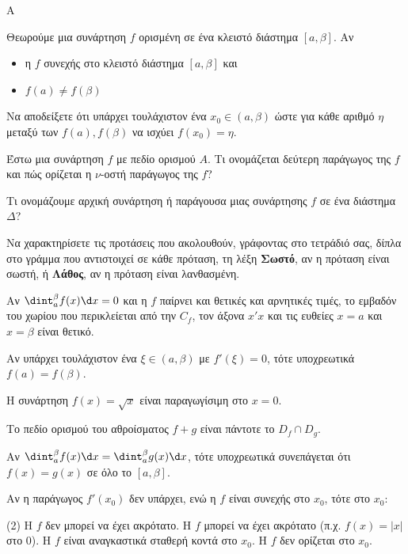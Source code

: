 \begin{thema}{A}
\begin{erwthma}
    \item Θεωρούμε μια συνάρτηση $f$ ορισμένη σε ένα κλειστό διάστημα $[a,\beta]$. Αν
\begin{itemize}
\item η $f$ συνεχής στο κλειστό διάστημα $[a,\beta]$ και 
\item $f(a)\neq f(\beta)$
\end{itemize}
Να αποδείξετε ότι υπάρχει τουλάχιστον ένα $ x_0\in(a,\beta) $ ώστε για κάθε αριθμό $ \eta $ μεταξύ των $ f(a),f(\beta) $ να ισχύει $ f(x_0)=\eta $.
    \item Έστω μια συνάρτηση $f$ με πεδίο ορισμού $A$. Τι ονομάζεται δεύτερη παράγωγος της $f$ και πώς ορίζεται η $\nu$-οστή παράγωγος της $f$?
    \item Τι ονομάζουμε αρχική συνάρτηση ή παράγουσα μιας συνάρτησης $f$ σε ένα διάστημα $\Delta$?
    \item Να χαρακτηρίσετε τις προτάσεις που ακολουθούν, γράφοντας στο τετράδιό σας, δίπλα στο γράμμα που αντιστοιχεί σε κάθε πρόταση, τη λέξη \textbf{Σωστό}, αν η πρόταση είναι σωστή, ή \textbf{Λάθος}, αν η πρόταση είναι λανθασμένη.
    \begin{alist}
        \item Αν $\dint_a^\beta f(x) \d x = 0$ και η $f$ παίρνει και θετικές και αρνητικές τιμές, το εμβαδόν του χωρίου που περικλείεται από την $C_f$, τον άξονα $x'x$ και τις ευθείες $x=a$ και $x=\beta$ είναι θετικό.
        \item Αν υπάρχει τουλάχιστον ένα $\xi \in (a, \beta)$ με $f'(\xi)=0$, τότε υποχρεωτικά $f(a)=f(\beta)$.
        \item Η συνάρτηση $f(x) = \sqrt{x}$ είναι παραγωγίσιμη στο $x=0$.
        \item Το πεδίο ορισμού του αθροίσματος $f+g$ είναι πάντοτε το $D_f\cap D_g$.
        \item Αν $\dint_a^\beta f(x) \d x = \dint_a^\beta g(x) \d x$, τότε υποχρεωτικά συνεπάγεται ότι $f(x) = g(x)$ σε όλο το $[a, \beta]$.
    \end{alist}
    \item Αν η παράγωγος $f'(x_0)$ δεν υπάρχει, ενώ η $f$ είναι συνεχής στο $x_0$, τότε στο $x_0$:
    \begin{tasks}[label=\let\textdexiakeraia\relax\alph*.](2)
        \task Η $f$ δεν μπορεί να έχει ακρότατο.
        \task Η $f$ μπορεί να έχει ακρότατο (π.χ. $f(x)=|x|$ στο $0$).
        \task Η $f$ είναι αναγκαστικά σταθερή κοντά στο $x_0$.
        \task Η $f$ δεν ορίζεται στο $x_0$.
    \end{tasks}
\end{erwthma}
\end{thema}


